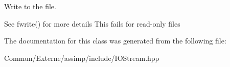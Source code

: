 Write to the file. 

See fwrite() for more details This fails for read-\/only files 

The documentation for this class was generated from the following file\+:\begin{DoxyCompactItemize}
\item 
Commun/\+Externe/assimp/include/I\+O\+Stream.\+hpp\end{DoxyCompactItemize}
